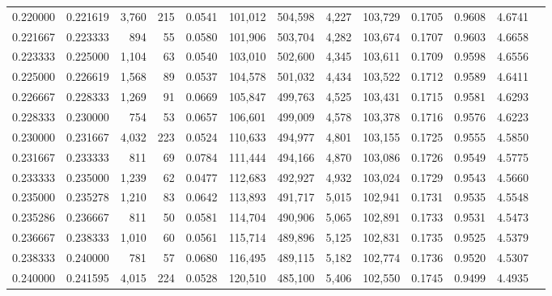 \begin{tabular}{rrrrrrrrrrrrr}
0.220000 & 0.221619 & 3,760 & 215 &                                     0.0541 & 101,012 & 504,598 &   4,227 & 103,729 & 0.1705 & 0.9608 & 4.6741 \\
0.221667 & 0.223333 &   894 &  55 &                                     0.0580 & 101,906 & 503,704 &   4,282 & 103,674 & 0.1707 & 0.9603 & 4.6658 \\
0.223333 & 0.225000 & 1,104 &  63 &                                     0.0540 & 103,010 & 502,600 &   4,345 & 103,611 & 0.1709 & 0.9598 & 4.6556 \\
0.225000 & 0.226619 & 1,568 &  89 &                                     0.0537 & 104,578 & 501,032 &   4,434 & 103,522 & 0.1712 & 0.9589 & 4.6411 \\
0.226667 & 0.228333 & 1,269 &  91 &                                     0.0669 & 105,847 & 499,763 &   4,525 & 103,431 & 0.1715 & 0.9581 & 4.6293 \\
0.228333 & 0.230000 &   754 &  53 &                                     0.0657 & 106,601 & 499,009 &   4,578 & 103,378 & 0.1716 & 0.9576 & 4.6223 \\
0.230000 & 0.231667 & 4,032 & 223 &                                     0.0524 & 110,633 & 494,977 &   4,801 & 103,155 & 0.1725 & 0.9555 & 4.5850 \\
0.231667 & 0.233333 &   811 &  69 &                                     0.0784 & 111,444 & 494,166 &   4,870 & 103,086 & 0.1726 & 0.9549 & 4.5775 \\
0.233333 & 0.235000 & 1,239 &  62 &                                     0.0477 & 112,683 & 492,927 &   4,932 & 103,024 & 0.1729 & 0.9543 & 4.5660 \\
0.235000 & 0.235278 & 1,210 &  83 &                                     0.0642 & 113,893 & 491,717 &   5,015 & 102,941 & 0.1731 & 0.9535 & 4.5548 \\
0.235286 & 0.236667 &   811 &  50 &                                     0.0581 & 114,704 & 490,906 &   5,065 & 102,891 & 0.1733 & 0.9531 & 4.5473 \\
0.236667 & 0.238333 & 1,010 &  60 &                                     0.0561 & 115,714 & 489,896 &   5,125 & 102,831 & 0.1735 & 0.9525 & 4.5379 \\
0.238333 & 0.240000 &   781 &  57 &                                     0.0680 & 116,495 & 489,115 &   5,182 & 102,774 & 0.1736 & 0.9520 & 4.5307 \\
0.240000 & 0.241595 & 4,015 & 224 &                                     0.0528 & 120,510 & 485,100 &   5,406 & 102,550 & 0.1745 & 0.9499 & 4.4935 \\

\end{tabular}
